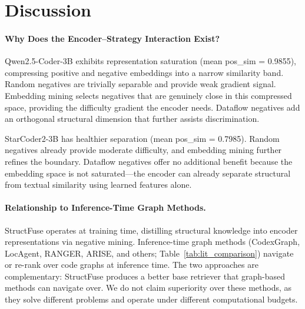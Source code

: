 \documentclass[11pt]{article}
\begin{document}
\section{Discussion}
\label{sec:discussion}

\paragraph{Why Does the Encoder--Strategy Interaction Exist?}
Qwen2.5-Coder-3B exhibits representation saturation (mean pos\_sim = 0.9855), compressing positive and negative embeddings into a narrow similarity band.
Random negatives are trivially separable and provide weak gradient signal.
Embedding mining selects negatives that are genuinely close in this compressed space, providing the difficulty gradient the encoder needs.
Dataflow negatives add an orthogonal structural dimension that further assists discrimination.

StarCoder2-3B has healthier separation (mean pos\_sim = 0.7985).
Random negatives already provide moderate difficulty, and embedding mining further refines the boundary.
Dataflow negatives offer no additional benefit because the embedding space is not saturated---the encoder can already separate structural from textual similarity using learned features alone.

\paragraph{Relationship to Inference-Time Graph Methods.}
StructFuse operates at training time, distilling structural knowledge into encoder representations via negative mining.
Inference-time graph methods (CodexGraph, LocAgent, RANGER, ARISE, and others; Table~\ref{tab:lit_comparison}) navigate or re-rank over code graphs at inference time.
The two approaches are complementary: StructFuse produces a better base retriever that graph-based methods can navigate over.
We do not claim superiority over these methods, as they solve different problems and operate under different computational budgets.
\end{document}
